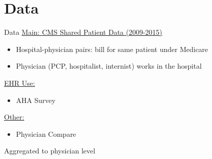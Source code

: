 \documentclass[10pt]{beamer}
\begin{document}
\section{Data}

\begin{frame}{Data}
    \underline{Main: CMS Shared Patient Data (2009-2015)}
    \begin{itemize}
        \item Hospital-physician pairs: bill for same patient under Medicare
        \item Physician (PCP, hospitalist, internist) works in the hospital
    \end{itemize}
    
    \vspace{3mm}
    
    \underline{EHR Use:}
    \begin{itemize}
        \item AHA Survey
    \end{itemize}
    
    \vspace{3mm}
    
    \underline{Other:}
    \begin{itemize}
        \item Physician Compare
    \end{itemize}
    
    \vspace{3mm}
    
    Aggregated to physician level
\end{frame}
\end{document}
